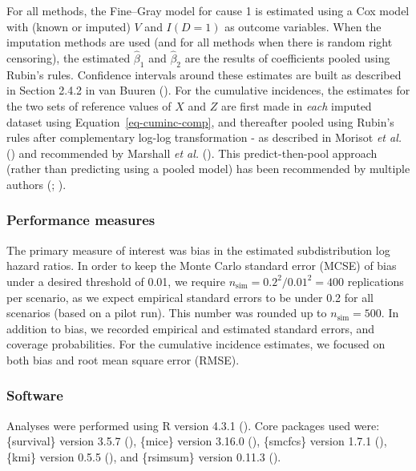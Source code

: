 \documentclass[
  letterpaper,
  DIV=11,
  numbers=noendperiod]{scrreprt}
\begin{document}
For all methods, the Fine--Gray model for cause 1 is estimated using a
Cox model with (known or imputed) \(V\) and \(I(D = 1)\) as outcome
variables. When the imputation methods are used (and for all methods
when there is random right censoring), the estimated \(\hat{\beta}_{1}\)
and \(\hat{\beta}_{2}\) are the results of coefficients pooled using
Rubin's rules. Confidence intervals around these estimates are built as
described in Section 2.4.2 in van Buuren
(). For the
cumulative incidences, the estimates for the two sets of reference
values of \(X\) and \(Z\) are first made in \emph{each} imputed dataset
using Equation~\ref{eq-cuminc-comp}, and thereafter pooled using Rubin's
rules after complementary log-log transformation - as described in
Morisot \emph{et al.}
() and recommended by
Marshall \emph{et al.}
(). This
predict-then-pool approach (rather than predicting using a pooled model)
has been recommended by multiple authors
(;
).

\subsubsection{Performance measures}\label{performance-measures-1}

The primary measure of interest was bias in the estimated
subdistribution log hazard ratios. In order to keep the Monte Carlo
standard error (MCSE) of bias under a desired threshold of 0.01, we
require \(n_{\text{sim}} = 0.2^2/0.01^2 = 400\) replications per
scenario, as we expect empirical standard errors to be under 0.2 for all
scenarios (based on a pilot run). This number was rounded up to
\(n_{\text{sim}} = 500\). In addition to bias, we recorded empirical and
estimated standard errors, and coverage probabilities. For the
cumulative incidence estimates, we focused on both bias and root mean
square error (RMSE).

\subsubsection{Software}\label{software-1}

Analyses were performed using R version 4.3.1
(). Core packages used were: \{survival\} version 3.5.7
(), \{mice\} version
3.16.0 (), \{smcfcs\} version 1.7.1
(), \{kmi\} version 0.5.5
(), and \{rsimsum\} version 0.11.3
().
\end{document}
